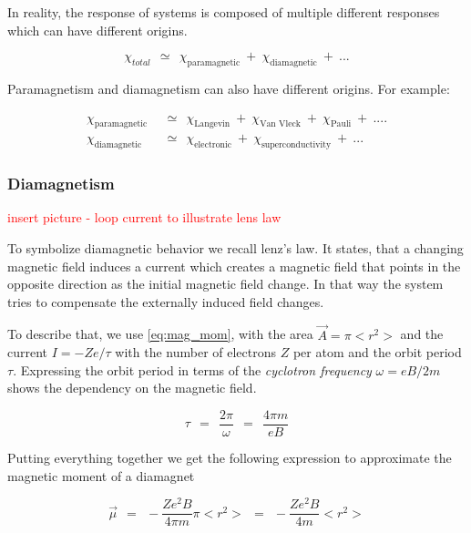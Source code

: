 \documentclass[10pt]{report}
\numberwithin{equation}{chapter}
\begin{document}
In reality, the response of systems is composed of multiple different responses which can have different origins.

\begin{equation}
  \chi_{total} ~~≃~~ \chi_\text{paramagnetic} ~+~ \chi_\text{diamagnetic} ~+~ ...
\end{equation}

Paramagnetism and diamagnetism can also have different origins. For example:

\begin{align*}
  \chi_\text{paramagnetic} ~~& ≃~~ \chi_\text{Langevin} ~+~ \chi_\text{Van Vleck} ~+~ \chi_\text{Pauli} ~+~ ....\\
  \chi_\text{diamagnetic} ~~& ≃~~ \chi_\text{electronic} ~+~ \chi_\text{superconductivity} ~+~ ...  
\end{align*}



\subsubsection{Diamagnetism}

\textcolor{red}{insert picture - loop current to illustrate lens law}

To symbolize diamagnetic behavior we recall lenz's law. 
It states, that a changing magnetic field induces a current which creates a magnetic field that points in the opposite direction as the initial magnetic field change. 
In that way the system tries to compensate the externally induced field changes.

To describe that, we use \ref{eq:mag_mom}, with the area $\vec{A} = \pi <r^2>$ and the current $I = -Z e/ \tau$ with the number of electrons $Z$ per atom and the orbit period $\tau$. 
Expressing the orbit period in terms of the \textit{cyclotron frequency} $\omega = eB/2m$ shows the dependency on the magnetic field.

\begin{equation}
  \tau ~~=~~ \frac{2\pi}{\omega} ~~=~~ \frac{4\pi m}{e B}
\end{equation}

Putting everything together we get the following expression to approximate the magnetic moment of a diamagnet

\begin{equation} \label{eq:mag_mom_diamag}
  \vec{\mu} ~~=~~ -\frac{Z e^2 B}{4\pi m} \pi <r^2> ~~=~~ -\frac{Ze^2B}{4m} <r^2>
\end{equation}
\end{document}
